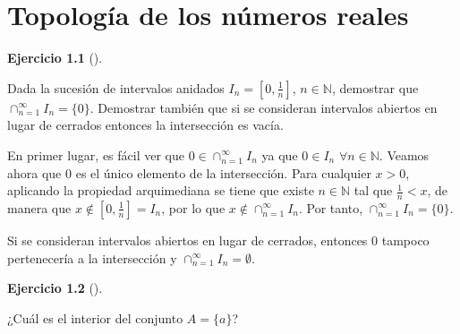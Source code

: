 \documentclass[
  spanish,
  a4paper,
]{scrreport}
\theoremstyle{definition}
\newtheorem{exercise}{Ejercicio}[chapter]
\theoremstyle{remark}
\begin{document}

\chapter{Topología de los números
reales}\label{topologuxeda-de-los-nuxfameros-reales}

\begin{exercise}[]\protect\hypertarget{exr-sucesion-intervalos-anidados}{}\label{exr-sucesion-intervalos-anidados}

Dada la sucesión de intervalos anidados \(I_n=[0,\frac{1}{n}]\),
\(n\in\mathbb{N}\), demostrar que \(\cap_{n=1}^\infty I_n= \{0\}\).
Demostrar también que si se consideran intervalos abiertos en lugar de
cerrados entonces la intersección es vacía.

\end{exercise}

\begin{tcolorbox}[enhanced jigsaw, arc=.35mm, bottomrule=.15mm, bottomtitle=1mm, breakable, colback=white, colbacktitle=quarto-callout-tip-color!10!white, colframe=quarto-callout-tip-color-frame, coltitle=black, left=2mm, leftrule=.75mm, opacityback=0, opacitybacktitle=0.6, rightrule=.15mm, title=\textcolor{quarto-callout-tip-color}{\faLightbulb}\hspace{0.5em}{Solución}, titlerule=0mm, toprule=.15mm, toptitle=1mm]

En primer lugar, es fácil ver que \(0\in\cap_{n=1}^\infty I_n\) ya que
\(0\in I_n\) \(\forall n\in\mathbb{N}\). Veamos ahora que \(0\) es el
único elemento de la intersección. Para cualquier \(x>0\), aplicando la
propiedad arquimediana se tiene que existe \(n\in\mathbb{N}\) tal que
\(\frac{1}{n}<x\), de manera que \(x\not\in [0,\frac{1}{n}]=I_n\), por
lo que \(x\not\in\cap_{n=1}^\infty I_n\). Por tanto,
\(\cap_{n=1}^\infty I_n=\{0\}\).

Si se consideran intervalos abiertos en lugar de cerrados, entonces
\(0\) tampoco pertenecería a la intersección y
\(\cap_{n=1}^\infty I_n=\emptyset\).

\end{tcolorbox}

\begin{exercise}[]\protect\hypertarget{exr-interior-conjunto-unitario}{}\label{exr-interior-conjunto-unitario}

¿Cuál es el interior del conjunto \(A=\{a\}\)?

\end{exercise}
\end{document}
